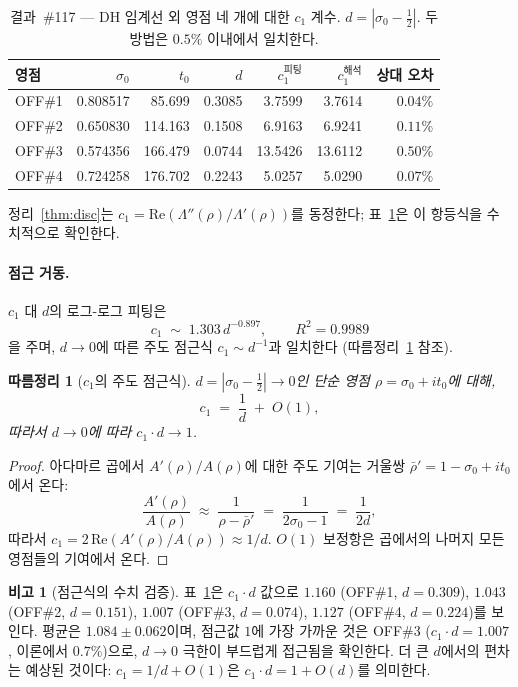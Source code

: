 \documentclass[11pt, a4paper]{article}
\theoremstyle{plain}
\newtheorem{corollary}[theorem]{따름정리}
\theoremstyle{definition}
\newtheorem{remark}{비고}[section]
\begin{document}
\begin{table}[ht]
\centering
\caption{결과~\#117 — DH 임계선 외 영점 네 개에 대한 $c_{1}$ 계수.
  $d=|\sigma_{0}-\tfrac{1}{2}|$. 두 방법은 $0.5\%$ 이내에서 일치한다.}
\label{tab:c1117}
\small
\begin{tabular}{lrrrrrr}
\toprule
영점 & $\sigma_{0}$ & $t_{0}$ & $d$ & $c_{1}^{\text{피팅}}$
     & $c_{1}^{\text{해석}}$ & 상대 오차 \\
\midrule
OFF\#1 & 0.808517 & 85.699  & 0.3085 & 3.7599 & 3.7614 & $0.04\%$ \\
OFF\#2 & 0.650830 & 114.163 & 0.1508 & 6.9163 & 6.9241 & $0.11\%$ \\
OFF\#3 & 0.574356 & 166.479 & 0.0744 & 13.5426 & 13.6112 & $0.50\%$ \\
OFF\#4 & 0.724258 & 176.702 & 0.2243 & 5.0257 & 5.0290 & $0.07\%$ \\
\bottomrule
\end{tabular}
\end{table}

정리~\ref{thm:disc}는 $c_{1}=\mathrm{Re}(\Lambda''(\rho)/\Lambda'(\rho))$를
동정한다; 표~\ref{tab:c1117}은 이 항등식을 수치적으로 확인한다.

\paragraph{점근 거동.}
$c_{1}$ 대 $d$의 로그-로그 피팅은
\[
  c_{1} \;\sim\; 1.303\,d^{-0.897}, \qquad R^{2}=0.9989
\]
을 주며, $d\to 0$에 따른 주도 점근식 $c_{1}\sim d^{-1}$과 일치한다
(따름정리~\ref{cor:asym} 참조).

\begin{corollary}[$c_{1}$의 주도 점근식]
\label{cor:asym}
  $d=|\sigma_{0}-\tfrac{1}{2}|\to 0$인 단순 영점
  $\rho=\sigma_{0}+it_{0}$에 대해,
  \[
    c_{1} \;=\; \frac{1}{d} \;+\; O(1),
  \]
  따라서 $d\to 0$에 따라 $c_{1}\cdot d \to 1$.
\end{corollary}

\begin{proof}
  아다마르 곱에서 $A'(\rho)/A(\rho)$에 대한 주도 기여는
  거울쌍 $\bar\rho' = 1-\sigma_{0}+it_{0}$에서 온다:
  \[
    \frac{A'(\rho)}{A(\rho)} \;\approx\; \frac{1}{\rho-\bar\rho'}
    \;=\; \frac{1}{2\sigma_{0}-1} \;=\; \frac{1}{2d},
  \]
  따라서 $c_{1}=2\,\mathrm{Re}(A'(\rho)/A(\rho))\approx 1/d$.
  $O(1)$ 보정항은 곱에서의 나머지 모든 영점들의 기여에서 온다.
\end{proof}

\begin{remark}[점근식의 수치 검증]
  표~\ref{tab:c1117}은 $c_{1}\cdot d$ 값으로
  $1.160$ (OFF\#1, $d=0.309$), $1.043$ (OFF\#2, $d=0.151$),
  $1.007$ (OFF\#3, $d=0.074$), $1.127$ (OFF\#4, $d=0.224$)를 보인다.
  평균은 $1.084\pm 0.062$이며, 점근값 $1$에 가장 가까운 것은
  OFF\#3 ($c_{1}\cdot d = 1.007$, 이론에서 $0.7\%$)으로,
  $d\to 0$ 극한이 부드럽게 접근됨을 확인한다.
  더 큰 $d$에서의 편차는 예상된 것이다:
  $c_{1}=1/d+O(1)$은 $c_{1}\cdot d = 1 + O(d)$를 의미한다.
\end{remark}
\end{document}
